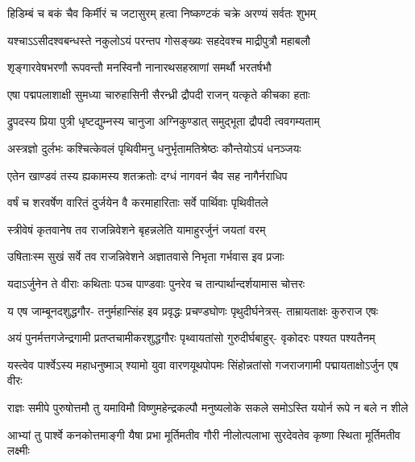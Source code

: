 \twolineshloka
{हिडिम्बं च बकं चैव किर्मीरं च जटासुरम्}
{हत्वा निष्कण्टकं चक्रे अरण्यं सर्वतः शुभम्}


\twolineshloka
{यश्चाऽऽसीदश्वबन्धस्ते नकुलोऽयं परन्तप}
{गोसङ्ख्यः सहदेवश्च माद्रीपुत्रौ महाबलौ}


\twolineshloka
{शृङ्गारवेषभरणौ रूपवन्तौ मनस्विनौ}
{नानारथसहस्राणां समर्थौ भरतर्षभौ}


\twolineshloka
{एषा पद्मपलाशाक्षी सुमध्या चारुहासिनी}
{सैरन्ध्री द्रौपदी राजन् यत्कृते कीचका हताः}


\twolineshloka
{द्रुपदस्य प्रिया पुत्री धृष्टद्युम्नस्य चानुजा}
{अग्निकुण्डात् समुद्भूता द्रौपदी त्ववगम्यताम्}



\twolineshloka
{अस्त्रज्ञो दुर्लभः कश्चित्केवलं पृथिवीमनु}
{धनुर्भृतामतिश्रेष्ठः कौन्तेयोऽयं धनञ्जयः}


\twolineshloka
{एतेन खाण्डवं तस्य ह्यकामस्य शतक्रतोः}
{दग्धं नागवनं चैव सह नागैर्नराधिप}


\twolineshloka
{वर्षं च शरवर्षेण वारितं दुर्जयेन वै}
{करमाहारिताः सर्वे पार्थिवाः पृथिवीतले}


\twolineshloka
{स्त्रीवेषं कृतवानेष तव राजन्निवेशने}
{बृहन्नलेति यामाहुरर्जुनं जयतां वरम्}


\twolineshloka
{उषिताःस्म सुखं सर्वे तव राजन्निवेशने}
{अज्ञातवासे निभृता गर्भवास इव प्रजाः}



\twolineshloka
{यदाऽर्जुनेन ते वीराः कथिताः पञ्च पाण्डवाः}
{पुनरेव च तान्पार्थान्दर्शयामास चोत्तरः}



\fourlineindentedshloka
{य एष जाम्बूनदशुद्धगौर-}
{तनुर्महान्सिंह इव प्रवृद्धः}
{प्रचण्डघोणः पृथुदीर्घनेत्रस्-}
{ताम्रायताक्षः कुरुराज एषः}


\fourlineindentedshloka
{अयं पुनर्मत्तगजेन्द्रगामी}
{प्रतप्तचामीकरशुद्धगौरः}
{पृथ्वायतांसो गुरुदीर्घबाहुर्-}
{वृकोदरः पश्यत पश्यतैनम्}


\fourlineindentedshloka
{यस्त्वेव पार्श्वेऽस्य महाधनुष्माञ्}
{श्यामो युवा वारणयूथपोपमः}
{सिंहोन्नतांसो गजराजगामी}
{पद्मायताक्षोऽर्जुन एष वीरः}


\fourlineindentedshloka
{राज्ञः समीपे पुरुषोत्तमौ तु}
{यमाविमौ विष्णुमहेन्द्रकल्पौ}
{मनुष्यलोके सकले समोऽस्ति}
{ययोर्न रूपे न बले न शीले}


\fourlineindentedshloka
{आभ्यां तु पार्श्वे कनकोत्तमाङ्गी}
{यैषा प्रभा मूर्तिमतीव गौरी}
{नीलोत्पलाभा सुरदेवतेव}
{कृष्णा स्थिता मूर्तिमतीव लक्ष्मीः}


